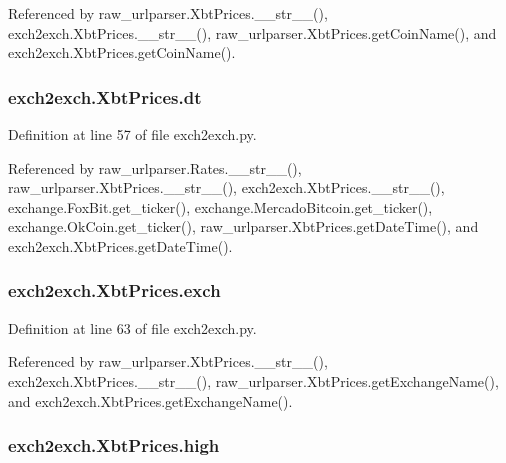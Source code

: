 Referenced by raw\-\_\-urlparser.\-Xbt\-Prices.\-\_\-\-\_\-str\-\_\-\-\_\-(), exch2exch.\-Xbt\-Prices.\-\_\-\-\_\-str\-\_\-\-\_\-(), raw\-\_\-urlparser.\-Xbt\-Prices.\-get\-Coin\-Name(), and exch2exch.\-Xbt\-Prices.\-get\-Coin\-Name().

\hypertarget{classexch2exch_1_1_xbt_prices_af9f916c683c48631c97f1c5d91447751}{
\subsubsection[{dt}]{\setlength{\rightskip}{0pt plus 5cm}exch2exch.\-Xbt\-Prices.\-dt}}\label{classexch2exch_1_1_xbt_prices_af9f916c683c48631c97f1c5d91447751}


Definition at line 57 of file exch2exch.\-py.



Referenced by raw\-\_\-urlparser.\-Rates.\-\_\-\-\_\-str\-\_\-\-\_\-(), raw\-\_\-urlparser.\-Xbt\-Prices.\-\_\-\-\_\-str\-\_\-\-\_\-(), exch2exch.\-Xbt\-Prices.\-\_\-\-\_\-str\-\_\-\-\_\-(), exchange.\-Fox\-Bit.\-get\-\_\-ticker(), exchange.\-Mercado\-Bitcoin.\-get\-\_\-ticker(), exchange.\-Ok\-Coin.\-get\-\_\-ticker(), raw\-\_\-urlparser.\-Xbt\-Prices.\-get\-Date\-Time(), and exch2exch.\-Xbt\-Prices.\-get\-Date\-Time().

\hypertarget{classexch2exch_1_1_xbt_prices_a72caf3a29017a1ceaf4367240a46b360}{
\subsubsection[{exch}]{\setlength{\rightskip}{0pt plus 5cm}exch2exch.\-Xbt\-Prices.\-exch}}\label{classexch2exch_1_1_xbt_prices_a72caf3a29017a1ceaf4367240a46b360}


Definition at line 63 of file exch2exch.\-py.



Referenced by raw\-\_\-urlparser.\-Xbt\-Prices.\-\_\-\-\_\-str\-\_\-\-\_\-(), exch2exch.\-Xbt\-Prices.\-\_\-\-\_\-str\-\_\-\-\_\-(), raw\-\_\-urlparser.\-Xbt\-Prices.\-get\-Exchange\-Name(), and exch2exch.\-Xbt\-Prices.\-get\-Exchange\-Name().

\hypertarget{classexch2exch_1_1_xbt_prices_aeae6235417d65d9e9c768a51c38d5388}{
\subsubsection[{high}]{\setlength{\rightskip}{0pt plus 5cm}exch2exch.\-Xbt\-Prices.\-high}}\label{classexch2exch_1_1_xbt_prices_aeae6235417d65d9e9c768a51c38d5388}


